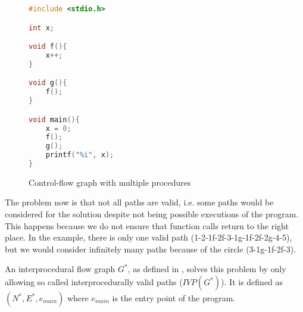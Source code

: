 \begin{figure}[ht]
\begin{minipage}[t]{0.5\textwidth}
\hfill
\begin{lstlisting}[language=C]
#include <stdio.h>

int x;

void f(){
    x++;
}

void g(){
    f();
}

void main(){
    x = 0;
    f();
    g();
    printf("%i", x);
}
\end{lstlisting}
\end{minipage}
\begin{minipage}[t]{0.5\textwidth}
\vspace{0pt}
\centering
{}
\end{minipage}
  \caption{Control-flow graph with multiple procedures}
  \label{fig:ivp}
\end{figure}

The problem now is that not all paths are valid, i.e. some paths would be considered for the solution despite not being possible executions of the program. This happens because we do not ensure that function calls return to the right place.
In the example, there is only one valid path (1-2-1f-2f-3-1g-1f-2f-2g-4-5), but we would consider infinitely many paths because of the circle (3-1g-1f-2f-3).

An interprocedural flow graph $G^*$, as defined in \cite{Sharir:1981:CallStrings}, solves this problem by only allowing so called interprocedurally valid paths ($\mathit{IVP}(G^*)$). It is defined as $(N^*,E^*,e_{main})$ where $e_{main}$ is the entry point of the program.

